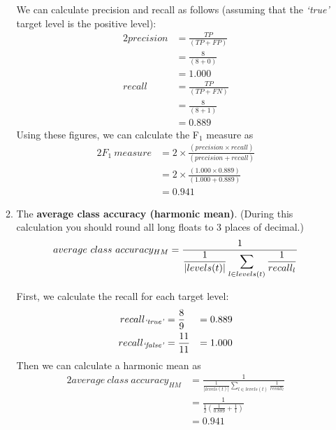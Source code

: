 \documentclass[--SOLUTION-OPTION--]{ditpaper}
\newcommand{\featL}[1]{\textit{`#1'}}
\begin{document}
\begin{enumerate}
\begin{enumerate}
\begin{answer}
We can calculate precision and recall as follows (assuming that the \featL{true} target level is the positive level):
\begin{alignat*}{2}
precision & = \frac{TP}{\left(TP + FP\right)} \\
& = \frac{8}{\left(8 + 0\right)} \\
& = 1.000 \\
recall & = \frac{TP}{\left(TP + FN\right)} \\
& = \frac{8}{\left(8 + 1\right)} \\
& = 0.889
\end{alignat*}
Using these figures, we can calculate the F$_1$ measure as
\begin{alignat*}{2}
F_1~measure & = 2 \times \frac{\left(precision \times recall \right)}{\left(precision + recall\right)} \\
& = 2 \times \frac{\left(1.000 \times 0.889 \right)}{\left(1.000 + 0.889\right)} \\
& = 0.941
\end{alignat*}
\end{answer}
\item The \textbf{average class accuracy (harmonic mean)}. (During this calculation you should round all long floats to 3 places of decimal.)
\begin{equation*}
average~class~accuracy_{HM} = \displaystyle \frac{1}{\displaystyle \frac{1}{|levels(t)|}\sum_{l \in levels(t)} \frac{1}{recall_l}} \\
\end{equation*}
\begin{answer}
First, we calculate the recall for each target level:
\begin{alignat*}{3}
recall_{\text{\featL{true}}} & = \frac{8}{9} & = 0.889 \\
recall_{\text{\featL{false}}} & = \frac{11}{11} & = 1.000 
\end{alignat*}
Then we can calculate a harmonic mean as
\begin{alignat*}{2}
average~class~accuracy_{HM} & = \displaystyle \frac{1}{\displaystyle \frac{1}{|levels(t)|}\sum_{l \in levels(t)} \frac{1}{recall_l}} \\
& = \displaystyle \frac{1}{\displaystyle \frac{1}{2}\left( \frac{1}{0.889} + \frac{1}{1} \right) } \\
& = 0.941
\end{alignat*}
\end{answer}
\end{enumerate} 
\end{enumerate}
\end{document}
